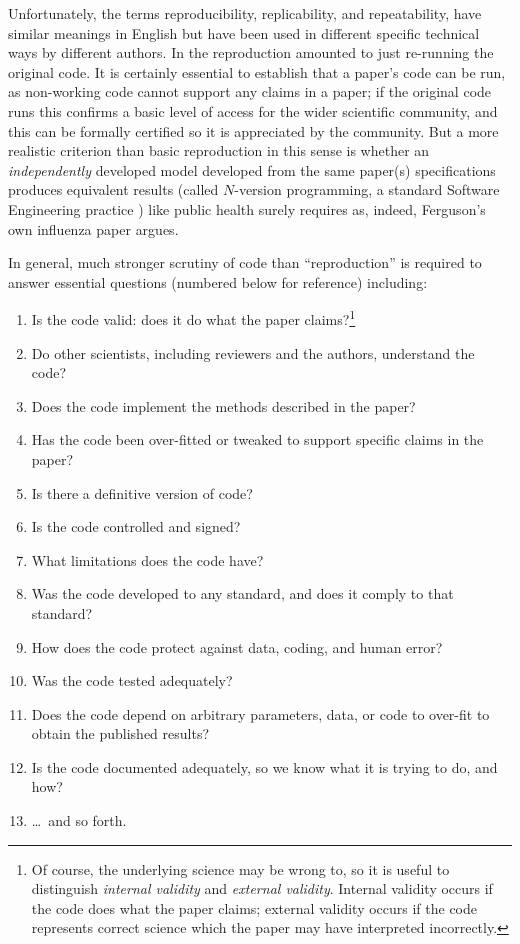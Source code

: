 \documentclass{comjnl}
\begin{document}
Unfortunately, the terms reproducibility, replicability, and repeatability, have similar meanings in English but have been used in different specific technical ways by different authors. In \cite{codecheck,thumbs-up} the reproduction amounted to just re-running the original code. It is certainly essential to establish that a paper's code can be run, as non-working code cannot support any claims in a paper; if the original code runs this confirms a basic level of access for the wider scientific community, and this can be formally certified \cite{codecheck-certificate} so it is appreciated by the community. But a more realistic criterion than basic reproduction in this sense is whether an \emph{independently\/} developed model developed from the same paper(s) specifications produces equivalent results (called $N$-version programming, a standard Software Engineering practice \cite{NVP}) like public health surely requires as, indeed, Ferguson's own influenza paper \cite{nvp-ferguson} argues. 

In general, much stronger scrutiny of code than ``reproduction'' is required to answer essential questions (numbered below for reference) including:

\newcount \enum
{}
\renewcommand{\theenumi}{\ifnum \enum<10 \hphantom{0}\fi
\the\enum
\global\advance \enum by 1}
\begin{enumerate}\raggedright
\item Is the code valid: does it do what the paper claims?\footnote{Of course, the underlying science may be wrong to, so it is useful to distinguish \emph{internal validity\/} and \emph{external validity}. Internal validity occurs if the code does what the paper claims; external validity occurs if the code represents correct science which the paper may have interpreted incorrectly.}
\item Do other scientists, including reviewers and the authors, understand the code?
\item Does the code implement the methods described in the paper?
\item Has the code been over-fitted or tweaked to support specific claims in the paper?
\item Is there a definitive version of code?
\item Is the code controlled and signed?
\item What limitations does the code have?
\item Was the code developed to any standard, and does it comply to that standard?
\item How does the code protect against data, coding, and human error?
\item Was the code tested adequately?
\item Does the code depend on arbitrary parameters, data, or code to over-fit to obtain the published results?
\item Is the code documented adequately, so we know what it is trying to do, and how?
\item \ldots\ and so forth. 
\end{enumerate}
\end{document}
